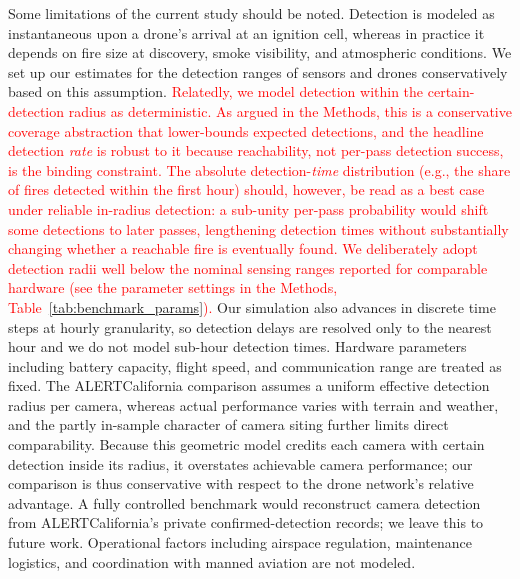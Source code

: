 \documentclass[pdflatex,sn-mathphys-num]{sn-jnl}%
\theoremstyle{thmstyleone}%
\theoremstyle{thmstyletwo}%
\theoremstyle{thmstylethree}%
\begin{document}
Some limitations of the current study should be noted. Detection is modeled as instantaneous upon a drone's arrival at an ignition cell, whereas in practice it depends on fire size at discovery, smoke visibility, and atmospheric conditions. We set up our estimates for the detection ranges of sensors and drones conservatively based on this assumption. \textcolor{red}{Relatedly, we model detection within the certain-detection radius as deterministic. As argued in the Methods, this is a conservative coverage abstraction that lower-bounds expected detections, and the headline detection \emph{rate} is robust to it because reachability, not per-pass detection success, is the binding constraint. The absolute detection-\emph{time} distribution (e.g., the share of fires detected within the first hour) should, however, be read as a best case under reliable in-radius detection: a sub-unity per-pass probability would shift some detections to later passes, lengthening detection times without substantially changing whether a reachable fire is eventually found. We deliberately adopt detection radii well below the nominal sensing ranges reported for comparable hardware (see the parameter settings in the Methods, Table~\ref{tab:benchmark_params}).} Our simulation also advances in discrete time steps at hourly granularity, so detection delays are resolved only to the nearest hour and we do not model sub-hour detection times. Hardware parameters including battery capacity, flight speed, and communication range are treated as fixed. The ALERTCalifornia comparison assumes a uniform effective detection radius per camera, whereas actual performance varies with terrain and weather, and the partly in-sample character of camera siting further limits direct comparability. Because this geometric model credits each camera with certain detection inside its radius, it overstates achievable camera performance; our comparison is thus conservative with respect to the drone network's relative advantage. A fully controlled benchmark would reconstruct camera detection from ALERTCalifornia's private confirmed-detection records; we leave this to future work. Operational factors including airspace regulation, maintenance logistics, and coordination with manned aviation are not modeled.
\end{document}
